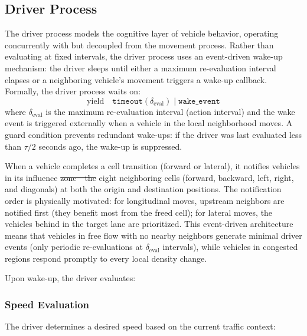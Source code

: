 \documentclass[review,authoryear]{elsarticle}
\providecommand{\DIFaddtex}[1]{{\protect\color{blue}\uwave{#1}}} %
\providecommand{\DIFdeltex}[1]{{\protect\color{red}\sout{#1}}}                      %
\providecommand{\DIFaddbegin}{} %
\providecommand{\DIFaddend}{} %
\providecommand{\DIFdelbegin}{} %
\providecommand{\DIFdelend}{} %
\providecommand{\DIFadd}[1]{\texorpdfstring{\DIFaddtex{#1}}{#1}} %
\providecommand{\DIFdel}[1]{\texorpdfstring{\DIFdeltex{#1}}{}} %
\newcommand{\DIFscaledelfig}{0.5}
\newlength{\DIFdelgraphicswidth} %
\newlength{\DIFdelgraphicsheight} %
\newcommand{\DIFaddincludegraphics}[2][]{{\color{blue}\fbox{\DIFOincludegraphics[#1]{#2}}}} %
\newcommand{\DIFdelincludegraphics}[2][]{%
\sbox{\DIFdelgraphicsbox}{\DIFOincludegraphics[#1]{#2}}%
\settoboxwidth{\DIFdelgraphicswidth}{\DIFdelgraphicsbox} %
\settoboxtotalheight{\DIFdelgraphicsheight}{\DIFdelgraphicsbox} %
\scalebox{\DIFscaledelfig}{%
\parbox[b]{\DIFdelgraphicswidth}{\usebox{\DIFdelgraphicsbox}\\[-\baselineskip] \rule{\DIFdelgraphicswidth}{0em}}\llap{\resizebox{\DIFdelgraphicswidth}{\DIFdelgraphicsheight}{%
\setlength{\unitlength}{\DIFdelgraphicswidth}%
\begin{picture}(1,1)%
\thicklines\linethickness{2pt} %
{\color[rgb]{1,0,0}\put(0,0){\framebox(1,1){}}}%
{\color[rgb]{1,0,0}\put(0,0){\line( 1,1){1}}}%
{\color[rgb]{1,0,0}\put(0,1){\line(1,-1){1}}}%
\end{picture}%
}\hspace*{3pt}}} %
} %
\DeclareRobustCommand{\DIFaddbegin}{\DIFOaddbegin \let\includegraphics\DIFaddincludegraphics} %
\DeclareRobustCommand{\DIFaddend}{\DIFOaddend \let\includegraphics\DIFOincludegraphics} %
\DeclareRobustCommand{\DIFdelbegin}{\DIFOdelbegin \let\includegraphics\DIFdelincludegraphics} %
\DeclareRobustCommand{\DIFdelend}{\DIFOaddend \let\includegraphics\DIFOincludegraphics} %
\begin{document}
\subsection{Driver Process}
\label{sec:driver}

The driver process models the cognitive layer of vehicle behavior, operating concurrently with but decoupled from the movement process. Rather than evaluating at fixed intervals, the driver process uses an event-driven wake-up mechanism: the driver sleeps until either a maximum re-evaluation interval elapses or a neighboring vehicle's movement triggers a wake-up callback. Formally, the driver process waits on:
\begin{equation}
    \text{yield} \quad \texttt{timeout}(\delta_{\text{eval}}) \;\big|\; \texttt{wake\_event}
    \label{eq:driver_yield}
\end{equation}
where $\delta_{\text{eval}}$ is the maximum re-evaluation interval (action interval) and the wake event is triggered externally when a vehicle in the local neighborhood moves. A guard condition prevents redundant wake-ups: if the driver was last evaluated less than $\tau/2$ seconds ago, the wake-up is suppressed.

When a vehicle completes a cell transition (forward or lateral), it notifies vehicles in its influence \DIFdelbegin \DIFdel{zone---the }\DIFdelend \DIFaddbegin \DIFadd{zone: the }\DIFaddend eight neighboring cells (forward, backward, left, right, and diagonals) at both the origin and destination positions. The notification order is physically motivated: for longitudinal moves, upstream neighbors are notified first (they benefit most from the freed cell); for lateral moves, the vehicles behind in the target lane are prioritized. This event-driven architecture means that vehicles in free flow with no nearby neighbors generate minimal driver events (only periodic re-evaluations at $\delta_{\text{eval}}$ intervals), while vehicles in congested regions respond promptly to every local density change.

Upon wake-up, the driver evaluates:

\subsubsection{Speed Evaluation}
\label{sec:speed_eval}

The driver determines a desired speed based on the current traffic context:
\end{document}
